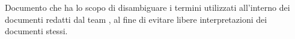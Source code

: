 Documento che ha lo scopo di disambiguare i termini utilizzati all'interno dei documenti redatti dal team \groupName{}, al fine di evitare libere interpretazioni dei documenti stessi. 
